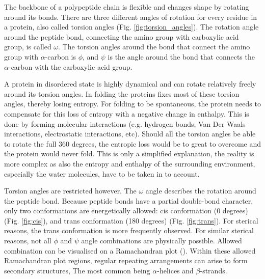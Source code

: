 The backbone of a polypeptide chain is flexible and changes shape by rotating around its bonds.
There are three different angles of rotation for every residue in a protein,
also called torsion angles (Fig. \ref{fig:torsion_angles}).
The rotation angle around the peptide bond, 
connecting the amino group with carboxylic acid group,
is called $\omega$.
The torsion angles around the bond that connect the amino group with $\alpha$-carbon is $\phi$,
and $\psi$ is the angle around the bond that connects the $\alpha$-carbon with the carboxylic acid group.

A protein in disordered state is highly dynamical and can rotate relatively freely around its torsion angles.
In folding the proteins fixes most of these torsion angles, 
thereby losing entropy.
For folding to be spontaneous, 
the protein needs to compensate for this loss of entropy with a negative change in enthalpy.
This is done by forming molecular interactions 
(e.g. hydrogen bonds, Van Der Waals interactions, electrostatic interactions, etc).
Should all the torsion angles be able to rotate the full 360 degrees,
the entropic loss would be to great to overcome
and the protein would never fold.
This is only a simplified explanation,
the reality is more complex as also the entropy and enthalpy of the surrounding environment,
especially the water molecules, have to be taken in to account.

Torsion angles are restricted however.
The $\omega$ angle describes the rotation around the peptide bond.
Because peptide bonds have a partial double-bond character, 
only two conformations are energetically allowed: 
cis conformation (0 degrees) (Fig. \ref{fig:cis}),
and trans conformation (180 degrees) (Fig. \ref{fig:trans}).
For sterical reasons,
the trans conformation is more frequently observed.
For similar sterical reasons,
not all $\phi$ and $\psi$ angle combinations are  physically possible.
Allowed combination can be visualised on a Ramachandran plot
(\cite{berg2015}).
Within these allowed Ramachandran plot regions,
regular repeating arrangements can arise to form secondary structures,
The most common being $\alpha$-helices and $\beta$-strands.

